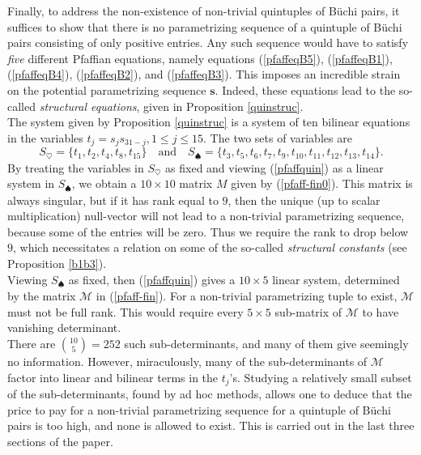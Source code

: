 \documentclass[letterpaper,10pt]{amsart}
\newcommand{\Bs}{{\mathbf{s}}}
\newcommand{\M}{{\mathcal{M}}}
\theoremstyle{definition}
\numberwithin{equation}{section}
\begin{document}
	Finally, to address the non-existence of non-trivial quintuples of B\"{u}chi pairs, it suffices to show that there is no parametrizing sequence of a quintuple of B\"{u}chi pairs consisting of only positive entries. Any such sequence would have to satisfy \emph{five} different Pfaffian equations, namely equations (\ref{pfaffeqB5}), (\ref{pfaffeqB1}), (\ref{pfaffeqB4}), (\ref{pfaffeqB2}), and (\ref{pfaffeqB3}). This imposes an incredible strain on the potential parametrizing sequence $\Bs$. Indeed, these equations lead to the so-called \emph{structural equations}, given in Proposition \ref{quinstruc}. \\
	
The system given by Proposition \ref{quinstruc} is a system of ten bilinear equations in the variables $t_j = s_j s_{31 - j}, 1 \leq j \leq 15$. The two sets of variables are 
\[S_\heartsuit = \{t_1, t_2, t_4, t_8, t_{15}\} \quad \text{and} \quad S_\spadesuit = \{t_3, t_5, t_6, t_7, t_9, t_{10}, t_{11}, t_{12}, t_{13}, t_{14}\}.\]
By treating the variables in $S_\heartsuit$ as fixed and viewing (\ref{pfaffquin}) as a linear system in $S_\spadesuit$, we obtain a $10 \times 10$ matrix $M$ given by (\ref{pfaff-fin0}). This matrix is always singular, but if it has rank equal to $9$, then the unique (up to scalar multiplication) null-vector will not lead to a non-trivial parametrizing sequence, because some of the entries will be zero. Thus we require the rank to drop below $9$, which necessitates a relation on some of the so-called \emph{structural constants} (see Proposition \ref{b1b3}). \\

Viewing $S_{\spadesuit}$ as fixed, then (\ref{pfaffquin}) gives a $10 \times 5$ linear system, determined by the matrix $\M$ in (\ref{pfaff-fin}). For a non-trivial parametrizing tuple to exist, $\M$ must not be full rank. This would require every $5 \times 5$ sub-matrix of $\M$ to have vanishing determinant. \\

There are $\binom{10}{5} = 252$ such sub-determinants, and many of them give seemingly no information. However, miraculously, many of the sub-determinants of $\M$ factor into linear and bilinear terms in the $t_j$'s. Studying a relatively small subset of the sub-determinants, found by ad hoc methods, allows one to deduce that the price to pay for a non-trivial parametrizing sequence for a quintuple of B\"{u}chi pairs is too high, and none is allowed to exist. This is carried out in the last three sections of the paper. 
	
\end{document}
